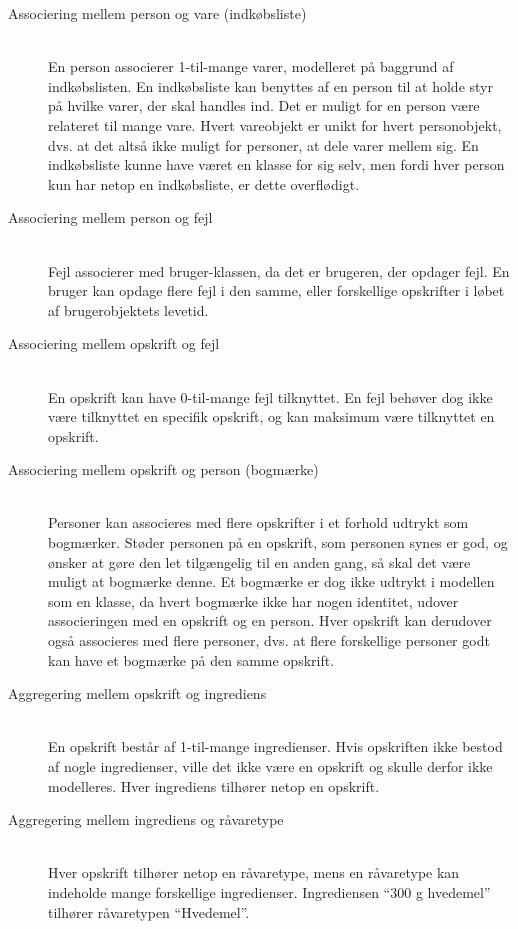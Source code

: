 \begin{description}

\item[Associering mellem person og vare (indkøbsliste)] \hfill \\
En person associerer 1-til-mange varer, modelleret på baggrund af indkøbslisten. En indkøbsliste kan benyttes af en person til at holde styr på hvilke varer, der skal handles ind.  Det er muligt for en person være relateret til mange vare. Hvert vareobjekt er unikt for hvert personobjekt, dvs. at det altså ikke muligt for personer, at dele varer mellem sig. En indkøbsliste kunne have været en klasse for sig selv, men fordi hver person kun har netop en indkøbsliste, er dette overflødigt.

\item[Associering mellem person og fejl] \hfill \\
Fejl associerer med bruger-klassen, da det er brugeren, der opdager fejl. En bruger kan opdage flere fejl i den samme, eller forskellige opskrifter i løbet af brugerobjektets levetid.

\item[Associering mellem opskrift og fejl] \hfill \\
En opskrift kan have 0-til-mange fejl tilknyttet. En fejl behøver dog ikke være tilknyttet en specifik opskrift, og kan maksimum være tilknyttet en opskrift.

\item[Associering mellem opskrift og person (bogmærke)] \hfill \\
Personer kan associeres med flere opskrifter i et forhold udtrykt som bogmærker. Støder personen på en opskrift, som personen synes er god, og ønsker at gøre den let tilgængelig til en anden gang, så skal det være muligt at bogmærke denne. Et bogmærke er dog ikke udtrykt i modellen som en klasse, da hvert bogmærke ikke har nogen identitet, udover associeringen med en opskrift og en person. Hver opskrift kan derudover også associeres med flere personer, dvs. at flere forskellige personer godt kan have et bogmærke på den samme opskrift. 

\item[Aggregering mellem opskrift og ingrediens] \hfill \\
En opskrift består af 1-til-mange ingredienser. Hvis opskriften ikke bestod af nogle ingredienser, ville det ikke være en opskrift og skulle derfor ikke modelleres. Hver ingrediens tilhører netop en opskrift.

\item[Aggregering mellem ingrediens og råvaretype] \hfill \\
Hver opskrift tilhører netop en råvaretype, mens en råvaretype kan indeholde mange forskellige ingredienser. Ingrediensen ``300 g hvedemel'' tilhører \fx råvaretypen ``Hvedemel''.

\end{description}

